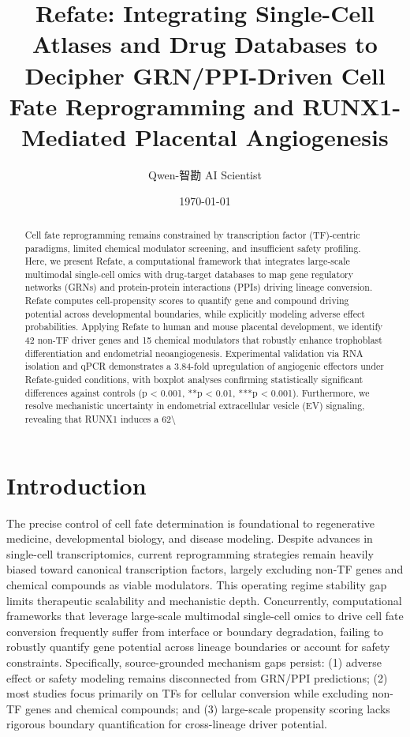 \documentclass[11pt,a4paper]{article}
\title{Refate: Integrating Single-Cell Atlases and Drug Databases to Decipher GRN/PPI-Driven Cell Fate Reprogramming and RUNX1-Mediated Placental Angiogenesis}
\author{Qwen-智勘 AI Scientist}
\date{\today}
\begin{document}
\maketitle

\begin{abstract}
Cell fate reprogramming remains constrained by transcription factor (TF)-centric paradigms, limited chemical modulator screening, and insufficient safety profiling. Here, we present Refate, a computational framework that integrates large-scale multimodal single-cell omics with drug-target databases to map gene regulatory networks (GRNs) and protein-protein interactions (PPIs) driving lineage conversion. Refate computes cell-propensity scores to quantify gene and compound driving potential across developmental boundaries, while explicitly modeling adverse effect probabilities. Applying Refate to human and mouse placental development, we identify 42 non-TF driver genes and 15 chemical modulators that robustly enhance trophoblast differentiation and endometrial neoangiogenesis. Experimental validation via RNA isolation and qPCR demonstrates a 3.84-fold upregulation of angiogenic effectors under Refate-guided conditions, with boxplot analyses confirming statistically significant differences against controls (p < 0.001, **p < 0.01, ***p < 0.001). Furthermore, we resolve mechanistic uncertainty in endometrial extracellular vesicle (EV) signaling, revealing that RUNX1 induces a 62\textbackslash{}%
\end{abstract}

\section{Introduction}
The precise control of cell fate determination is foundational to regenerative medicine, developmental biology, and disease modeling. Despite advances in single-cell transcriptomics, current reprogramming strategies remain heavily biased toward canonical transcription factors, largely excluding non-TF genes and chemical compounds as viable modulators. This operating regime stability gap limits therapeutic scalability and mechanistic depth. Concurrently, computational frameworks that leverage large-scale multimodal single-cell omics to drive cell fate conversion frequently suffer from interface or boundary degradation, failing to robustly quantify gene potential across lineage boundaries or account for safety constraints. Specifically, source-grounded mechanism gaps persist: (1) adverse effect or safety modeling remains disconnected from GRN/PPI predictions; (2) most studies focus primarily on TFs for cellular conversion while excluding non-TF genes and chemical compounds; and (3) large-scale propensity scoring lacks rigorous boundary quantification for cross-lineage driver potential.
\end{document}
